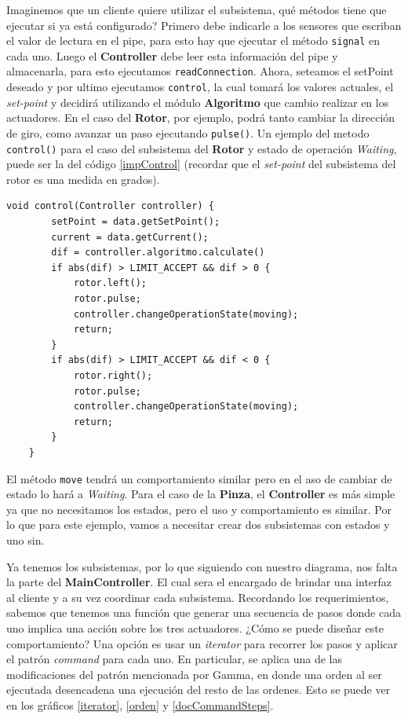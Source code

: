 Imaginemos que un cliente quiere utilizar el subsistema, qué métodos tiene que ejecutar si ya está configurado? Primero debe indicarle a los sensores que escriban el valor de lectura en el pipe, para esto hay que ejecutar el método \verb|signal| en cada uno. Luego el \textbf{Controller} debe leer esta información del pipe y almacenarla, para esto ejecutamos \verb|readConnection|. Ahora, seteamos el setPoint deseado y por ultimo ejecutamos \verb|control|, la cual tomará los valores actuales, el \textit{set-point} y decidirá utilizando el módulo \textbf{Algoritmo} que cambio realizar en los actuadores. En el caso del \textbf{Rotor}, por ejemplo, podrá tanto cambiar la dirección de giro, como avanzar un paso ejecutando \verb|pulse()|. Un ejemplo del metodo \verb|control()| para el caso del subsistema del \textbf{Rotor} y estado de operación \textit{Waiting}, puede ser la del código \ref{impControl} (recordar que el \textit{set-point} del subsistema del rotor es una medida en grados).

\begin{lstlisting}[caption=Ejemplo implementación control,label={impControl}]
    void control(Controller controller) {
        setPoint = data.getSetPoint();
        current = data.getCurrent();
        dif = controller.algoritmo.calculate()
        if abs(dif) > LIMIT_ACCEPT && dif > 0 {
            rotor.left();
            rotor.pulse;
            controller.changeOperationState(moving);
            return;
        }
        if abs(dif) > LIMIT_ACCEPT && dif < 0 {
            rotor.right();
            rotor.pulse;
            controller.changeOperationState(moving);
            return;
        }
    }
\end{lstlisting}

El método \verb|move| tendrá un comportamiento similar pero en el aso de cambiar de estado lo hará a \textit{Waiting}. Para el caso de la \textbf{Pinza}, el \textbf{Controller} es más simple ya que no necesitamos los estados, pero el uso y comportamiento es similar. Por lo que para este ejemplo, vamos a necesitar crear dos subsistemas con estados y uno sin.

Ya tenemos los subsistemas, por lo que siguiendo con nuestro diagrama, nos falta la parte del \textbf{MainController}. El cual sera el encargado de brindar una interfaz al cliente y a su vez coordinar cada subsistema. Recordando los requerimientos, sabemos que tenemos una función que generar una secuencia de pasos donde cada uno implica una acción sobre los tres actuadores. ¿Cómo se puede diseñar este comportamiento? Una opción es usar un \textit{iterator} para recorrer los pasos y aplicar el patrón \textit{command} para cada uno. En particular, se aplica una de las modificaciones del patrón mencionada por Gamma\cite{Gamma:1995:DPE:186897}, en donde una orden al ser ejecutada desencadena una ejecución del resto de las ordenes. Esto se puede ver en los gráficos \ref{iterator}, \ref{orden} y \ref{docCommandSteps}.

